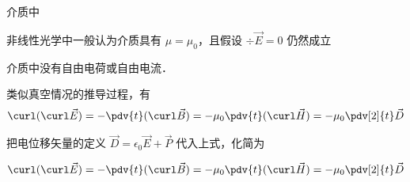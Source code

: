 

介质中

非线性光学中一般认为介质具有 $\mu = \mu_0$，且假设 $\div\vec E = 0$ 仍然成立

介质中没有自由电荷或自由电流．

类似真空情况的推导过程，有
\begin{equation}
\curl(\curl\vec E) = -\pdv{t} (\curl\vec B) = -\mu_0 \pdv{t} (\curl\vec H)
= -\mu_0 \pdv[2]{t} \vec D
\end{equation}

把电位移矢量的定义 $\vec D = \epsilon_0\vec E + \vec P$ 代入上式，化简为

\begin{equation}
\curl(\curl\vec E) = -\pdv{t} (\curl\vec B) = -\mu_0 \pdv{t} (\curl\vec H)
= -\mu_0 \pdv[2]{t} \vec D
\end{equation}